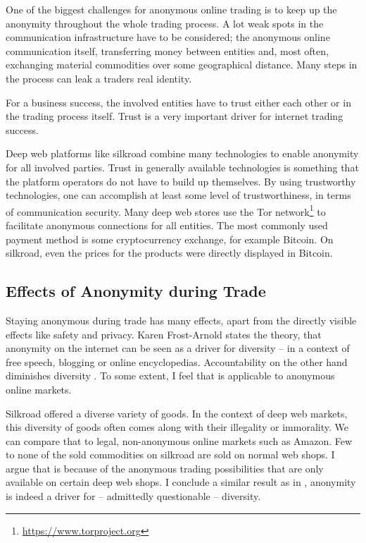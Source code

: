One of the biggest challenges for anonymous online trading is to keep up the anonymity throughout the whole trading process. A lot weak spots in the communication infrastructure have to be considered; the anonymous online communication itself, transferring money between entities and, most often, exchanging material commodities over some geographical distance. Many steps in the process can leak a traders real identity.

For a business success, the involved entities have to trust either each other or in the trading process itself. Trust is a very important driver for internet trading success\cite{internetTrust2004}.

Deep web platforms like silkroad\cite{silkroad2013} combine many technologies to enable anonymity for all involved parties. Trust in generally available technologies is something that the platform operators do not have to build up themselves. By using trustworthy technologies, one can accomplish at least some level of trustworthiness, in terms of communication security. Many deep web stores use the Tor network\footnote{\url{https://www.torproject.org}} to facilitate anonymous connections for all entities\cite{silkroad2013}. The most commonly used payment method is some cryptocurrency exchange, for example Bitcoin. On silkroad, even the prices for the products were directly displayed in Bitcoin\cite{silkroad2013}.

\subsection{Effects of Anonymity during Trade}

Staying anonymous during trade has many effects, apart from the directly visible effects like safety and privacy. Karen Frost-Arnold \cite{accountability2014} states the theory, that anonymity on the internet can be seen as a driver for diversity -- in a context of free speech, blogging or online encyclopedias. Accountability on the other hand diminishes diversity \cite{accountability2014}. To some extent, I feel that is applicable to anonymous online markets.

Silkroad offered a diverse variety of goods. In the context of deep web markets, this diversity of goods often comes along with their illegality or immorality\cite{silkroad2013}. We can compare that to legal, non-anonymous online markets such as Amazon. Few to none of the sold commodities on silkroad are sold on normal web shops. I argue that is because of the anonymous trading possibilities that are only available on certain deep web shops. I conclude a similar result as in \cite{accountability2014}, anonymity is indeed a driver for -- admittedly questionable -- diversity. 

